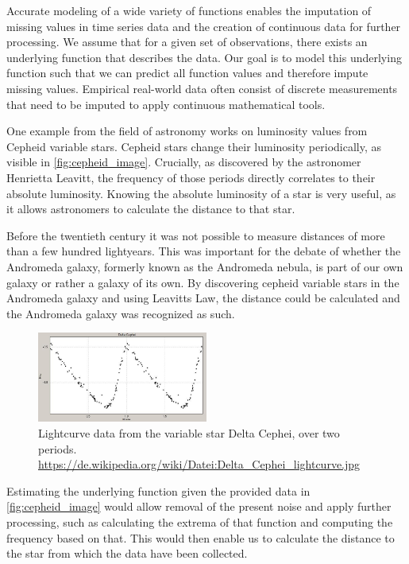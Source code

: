 Accurate modeling of a wide variety of functions enables the imputation of missing values in time series data and the creation of continuous data for further processing. We assume that for a given set of observations, there exists an underlying function that describes the data. Our goal is to model this underlying function such that we can predict all function values and therefore impute missing values. Empirical real-world data often consist of discrete measurements that need to be imputed to apply continuous mathematical tools.

One example from the field of astronomy works on luminosity values from Cepheid variable stars. Cepheid stars change their luminosity periodically, as visible in \autoref{fig:cepheid_image}. Crucially, as discovered by the astronomer Henrietta Leavitt, the frequency of those periods directly correlates to their absolute luminosity. Knowing the absolute luminosity of a star is very useful, as it allows astronomers to calculate the distance to that star.

Before the twentieth century it was not possible to measure distances of more than a few hundred lightyears. This was important for the debate of whether the Andromeda galaxy, formerly known as the Andromeda nebula, is part of our own galaxy or rather a galaxy of its own. By discovering cepheid variable stars in the Andromeda galaxy and using Leavitts Law, the distance could be calculated and the Andromeda galaxy was recognized as such. \cite{gaßnerAstroBook}

\begin{figure}[h]
	\centering
	\includegraphics[width = 0.5\textwidth]{figures/Cephei}
	\caption{Lightcurve data from the variable star Delta Cephei, over two periods. \tiny\url{ https://de.wikipedia.org/wiki/Datei:Delta_Cephei_lightcurve.jpg}}
	\label{fig:cepheid_image}
\end{figure}

Estimating the underlying function given the provided data in \autoref{fig:cepheid_image} would allow removal of the present noise and apply further processing, such as calculating the extrema of that function and computing the frequency based on that. This would then enable us to calculate the distance to the star from which the data have been collected.

